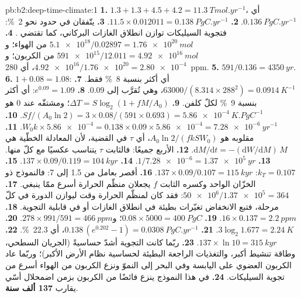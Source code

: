 \begin{solution}{pb:b2:deep-time-climate:1}
\textbf{1.} $1.3 + 1.3 + 4.5 + 4.2 = \qty{11.3}{Tmol.yr^{-1}}$، أي $\qty{0.136}{PgC.yr^{-1}}$.
\textbf{2.} $11.5\times0.012011 = \qty{0.138}{PgC.yr^{-1}}$.
\textbf{3.} يتّفقان في حدود نحو \qty{2}{\percent}: فتجوية السيليكات توازن انطلاق الغازات
البركاني، كما تقتضي .
\textbf{4.} $\num{5.1e18}/0.02897 = \qty{1.76e20}{mol}$ من الهواء؛ و$\num{591e15}/12.011 =
\qty{4.92e16}{mol}$ من الكربون؛ و$\num{4.92e16}/\num{1.76e20} = \num{2.80e-4}$، أي \qty{280}{ppm}.
\textbf{5.} $591/0.136 = \qty{4350}{yr}$.
\textbf{6.} $1 + 0.08 = 1.08$: أي أكثر بنسبة \qty{8}{\percent} فقط.
\textbf{7.} $63000/(8.314\times288^2) = \qty{0.0914}{K^{-1}}$، وهي تُقرَّب إلى 0.09.
\textbf{8.} $e^{0.09} = 1.09$: أي أكثر بنسبة \qty{9}{\percent} لكلّ كلفن.
\textbf{9.} $\Delta T = S\log_2(1 + fM/A_0)$؛ ومشتقّه عند 0 هو $Sf/(A_0\ln2) =
3\times0.08/(591\times0.693) = \qty{5.86e-4}{K.PgC^{-1}}$.
\textbf{10.} $W_0k\times\num{5.86e-4} = 0.138\times0.09\times\num{5.86e-4} = \qty{7.28e-6}{yr^{-1}}$.
\textbf{11.} مقلوبه هو $A_0\ln2/(fkSW_0)$، أي $\tau$ في القضية، لأن
المعادلة الخطّية هي $\mathrm dM/\mathrm dt = -(\mathrm dW/\mathrm dM)\,M$.
\textbf{12.} الأربع جميعًا: فالثابت $\tau$ يتناسب عكسيًا مع كلّ منها.
\textbf{13.} $1/\num{7.28e-6} = \qty{1.37e5}{yr}$.
\textbf{14.} $137\times0.09/0.119 = \qty{104}{kyr}$.
\textbf{15.} $k_T = 0.107$: $137\times0.09/0.107 = \qty{115}{kyr}$.
\textbf{16.} أقصر بعامل من 1.5 إلى 7: فالنموذج ذو الخزّان الواحد وكسره الثابت $f$ يجعلان
منظّم الحرارة أسرع ممّا ينبغي.
\textbf{17.} $\num{50e6}/\num{1.37e5} = 364$: فقد كان لمنظّم الحرارة وقت ليوازن الدورة في كلّ
مرحلة، فتبع الانخفاض تغيّرات بطيئة في انطلاق الغازات أو في قابلية التجوية.
\textbf{18.} $16\times0.137 = \qty{2.2}{ppm}$.
\textbf{19.} $0.08\times5000 = \qty{400}{PgC}$؛ و$278\times991/591 = \qty{466}{ppm}$.
\textbf{20.} $3\log_2 1.677 = \qty{2.24}{K}$.
\textbf{21.} $0.138\,(e^{0.202} - 1) = \qty{0.0308}{PgC.yr^{-1}}$، أي \qty{22.3}{\percent}.
\textbf{22.} $137\times\ln10 = \qty{315}{kyr}$.
\textbf{23.} ربّما كانت التجوية أشدّ حساسيةً (الجريان السطحي، وطاقة تنشيط أكبر،
والتغذيات الراجعة البطيئة لحساسية نظام الأرض الأكبر)؛ وربّما عاد الكربون العضوي على اليابسة وفي البحر إلى
النموّ ونزع الكربون من الهواء أسرع من تجوية السيليكات.
\textbf{24.} في هذا النموذج ينزع  فائضًا من الكربون بزمن
اضمحلال أسّي يقارب \textbf{\qty[text-series-to-math=true]{137}{} ألف سنة}.
\end{solution}
